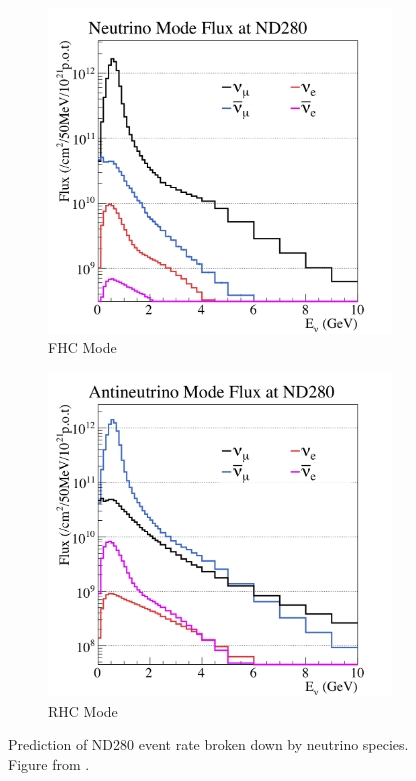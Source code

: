 \begin{figure}
\centering
\begin{subfigure}{.5\textwidth}
  \centering
  \includegraphics[width=.9\linewidth]{figs/nd5_alltunedflux_run1-9a_zoomed_13a}
  \caption{FHC Mode}
  \label{fig:fhcmode}
\end{subfigure}%
\begin{subfigure}{.5\textwidth}
  \centering
  \includegraphics[width=.9\linewidth]{figs/nd5_alltunedflux_run5c-9c_zoomed_antinu_13a}
  \caption{RHC Mode}
  \label{fig:rhcmode}
\end{subfigure}
\caption{Prediction of ND280 event rate broken down by neutrino species. Figure from \cite{vladisavljevic_2020}.}
\label{fig:modebreakdown}
\end{figure}

